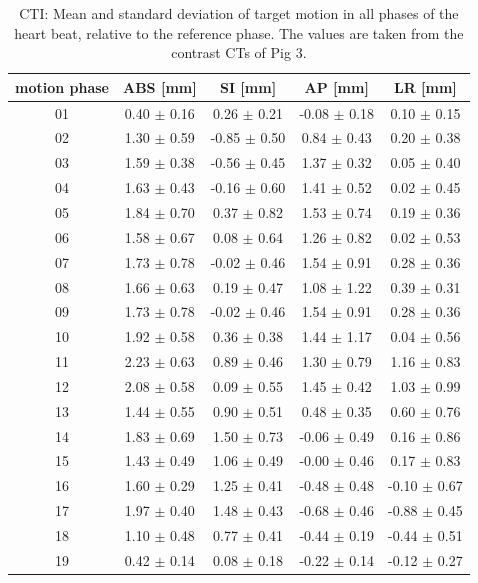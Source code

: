 \documentclass[type=dr, dr=rernat, accentcolor=tud7b,colorbacktitle, bigchapter, openright, twoside, 12pt ]{tudthesis}
\begin{document}
\newpage

\begin{table}[htbp]
  \centering
  \caption{CTI: Mean and standard deviation of target motion in all phases of the heart beat, relative to the reference phase. The values are 
  taken from the contrast CTs of Pig 3.}
  \begin{tabular}{|c|c|c|c|c|}
    \hline\hline
    motion phase\rule{0pt}{2.6ex}\rule[-1.2ex]{0pt}{0pt} & ABS [mm] & SI [mm] & AP [mm] & LR [mm]\\
    \hline
01 &0.40 $\pm$ 0.16 &0.26 $\pm$ 0.21 &-0.08 $\pm$ 0.18 &0.10 $\pm$ 0.15 \\
02 &1.30 $\pm$ 0.59 &-0.85 $\pm$ 0.50 &0.84 $\pm$ 0.43 &0.20 $\pm$ 0.38 \\
03 &1.59 $\pm$ 0.38 &-0.56 $\pm$ 0.45 &1.37 $\pm$ 0.32 &0.05 $\pm$ 0.40 \\
04 &1.63 $\pm$ 0.43 &-0.16 $\pm$ 0.60 &1.41 $\pm$ 0.52 &0.02 $\pm$ 0.45 \\
05 &1.84 $\pm$ 0.70 &0.37 $\pm$ 0.82 &1.53 $\pm$ 0.74 &0.19 $\pm$ 0.36 \\
06 &1.58 $\pm$ 0.67 &0.08 $\pm$ 0.64 &1.26 $\pm$ 0.82 &0.02 $\pm$ 0.53 \\
07 &1.73 $\pm$ 0.78 &-0.02 $\pm$ 0.46 &1.54 $\pm$ 0.91 &0.28 $\pm$ 0.36 \\
08 &1.66 $\pm$ 0.63 &0.19 $\pm$ 0.47 &1.08 $\pm$ 1.22 &0.39 $\pm$ 0.31 \\
09 &1.73 $\pm$ 0.78 &-0.02 $\pm$ 0.46 &1.54 $\pm$ 0.91 &0.28 $\pm$ 0.36 \\
10 &1.92 $\pm$ 0.58 &0.36 $\pm$ 0.38 &1.44 $\pm$ 1.17 &0.04 $\pm$ 0.56 \\
11 &2.23 $\pm$ 0.63 &0.89 $\pm$ 0.46 &1.30 $\pm$ 0.79 &1.16 $\pm$ 0.83 \\
12 &2.08 $\pm$ 0.58 &0.09 $\pm$ 0.55 &1.45 $\pm$ 0.42 &1.03 $\pm$ 0.99 \\
13 &1.44 $\pm$ 0.55 &0.90 $\pm$ 0.51 &0.48 $\pm$ 0.35 &0.60 $\pm$ 0.76 \\
14 &1.83 $\pm$ 0.69 &1.50 $\pm$ 0.73 &-0.06 $\pm$ 0.49 &0.16 $\pm$ 0.86 \\
15 &1.43 $\pm$ 0.49 &1.06 $\pm$ 0.49 &-0.00 $\pm$ 0.46 &0.17 $\pm$ 0.83 \\
16 &1.60 $\pm$ 0.29 &1.25 $\pm$ 0.41 &-0.48 $\pm$ 0.48 &-0.10 $\pm$ 0.67 \\
17 &1.97 $\pm$ 0.40 &1.48 $\pm$ 0.43 &-0.68 $\pm$ 0.46 &-0.88 $\pm$ 0.45 \\
18 &1.10 $\pm$ 0.48 &0.77 $\pm$ 0.41 &-0.44 $\pm$ 0.19 &-0.44 $\pm$ 0.51 \\
19 &0.42 $\pm$ 0.14 &0.08 $\pm$ 0.18 &-0.22 $\pm$ 0.14 &-0.12 $\pm$ 0.27 \\
    \hline\hline
  \end{tabular}
  \label{tab:motion:CTI:Pig3}
\end{table}
\end{document}
